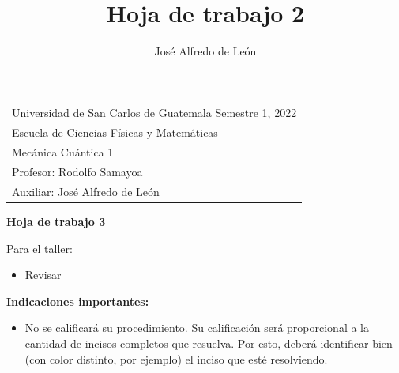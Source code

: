 \documentclass[11pt,letterpaper]{article}
\author{José Alfredo de León}
\title{Hoja de trabajo 2 \hspace{\fill}}
\begin{document}
\noindent
{}
\hspace{23mm}
\begin{tabular}{p{149mm}}
Universidad de San Carlos de Guatemala \hspace*{\fill} Semestre 1, 2022 \\
Escuela de Ciencias Físicas y Matemáticas  \\
Mecánica Cuántica 1            \\
Profesor: Rodolfo Samayoa      \\
Auxiliar: José Alfredo de León \\
\end{tabular}

\begin{center}
\bf\Large Hoja de trabajo 3
\end{center}

\noindent
\textcolor{jacolor}{
Para el taller: 
\begin{itemize}
\item Revisar 
\end{itemize}
}

\noindent\textbf{Indicaciones importantes:}
\begin{itemize}
\item No se calificará su procedimiento. Su calificación será proporcional
a la cantidad de incisos completos que resuelva. Por esto, 
deberá identificar bien (con color distinto, por ejemplo) el inciso que 
esté resolviendo.
\end{itemize}
\end{document}
